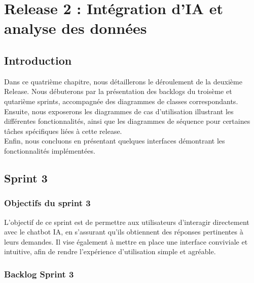 \chapter {Release 2 : Intégration d'IA et analyse des données}

\section{Introduction}
Dans ce quatrième chapitre, nous détaillerons le déroulement de la deuxième Release. Nous débuterons par la présentation des backlogs du troisème et qutarième sprints, accompagnée des diagrammes de classes
correspondants. Ensuite, nous exposerons les diagrammes de cas d’utilisation illustrant les différentes
fonctionnalités, ainsi que les diagrammes de séquence pour certaines tâches spécifiques liées à cette
release. \\
Enfin, nous concluons en présentant quelques interfaces démontrant les fonctionnalités implémentées.

\section{Sprint 3}
\subsection{Objectifs du sprint 3}
L’objectif de ce sprint est de permettre aux utilisateurs d’interagir directement avec le chatbot IA, en s’assurant qu’ils obtiennent des réponses pertinentes à leurs demandes. Il vise également à mettre en place une interface conviviale et intuitive, afin de rendre l’expérience d’utilisation simple et agréable.
\subsection{Backlog Sprint 3}

